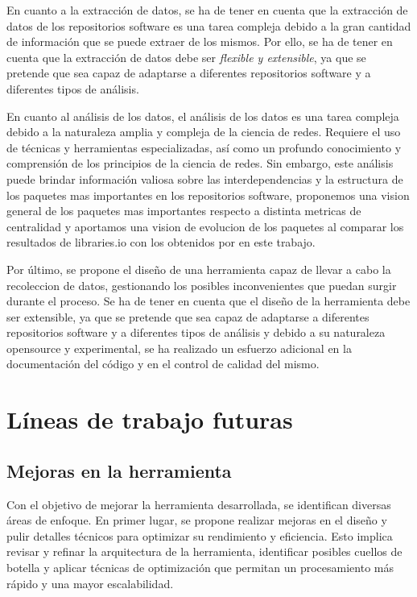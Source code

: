 En cuanto a la extracción de datos, se ha de tener en cuenta que la extracción de datos de los repositorios software es una tarea compleja debido
a la gran cantidad de información que se puede extraer de los mismos. Por ello, se ha de tener en cuenta que la extracción de datos debe ser
\emph{flexible y extensible}, ya que se pretende que sea capaz de adaptarse a diferentes repositorios software y a diferentes tipos de análisis.

En cuanto al análisis de los datos, el análisis de los datos es una tarea compleja debido a la naturaleza amplia y compleja de la ciencia de redes. 
Requiere el uso de técnicas y herramientas especializadas, así como un profundo conocimiento y comprensión de los principios de la ciencia de redes. 
Sin embargo, este análisis puede brindar información valiosa sobre las interdependencias y la estructura de los paquetes mas importantes en los repositorios software,
proponemos una vision general de los paquetes mas importantes respecto a distinta metricas de centralidad y aportamos una vision de evolucion de los paquetes
al comparar los resultados de libraries.io con los obtenidos por en este trabajo.

Por último, se propone el diseño de una herramienta capaz de llevar a cabo la recoleccion de datos, gestionando
los posibles inconvenientes que puedan surgir durante el proceso. Se ha de tener en cuenta que el diseño de la herramienta debe ser extensible, 
ya que se pretende que sea capaz de adaptarse a diferentes repositorios software y a diferentes tipos de análisis y debido a su
naturaleza opensource y experimental, se ha realizado un esfuerzo adicional en la documentación del código y en el control de calidad del mismo.


\section{Líneas de trabajo futuras}

\subsection{Mejoras en la herramienta}

Con el objetivo de mejorar la herramienta desarrollada, se identifican diversas áreas de enfoque. 
En primer lugar, se propone realizar mejoras en el diseño y pulir detalles técnicos para optimizar su rendimiento y eficiencia. 
Esto implica revisar y refinar la arquitectura de la herramienta, identificar posibles cuellos de botella y aplicar técnicas de 
optimización que permitan un procesamiento más rápido y una mayor escalabilidad.

